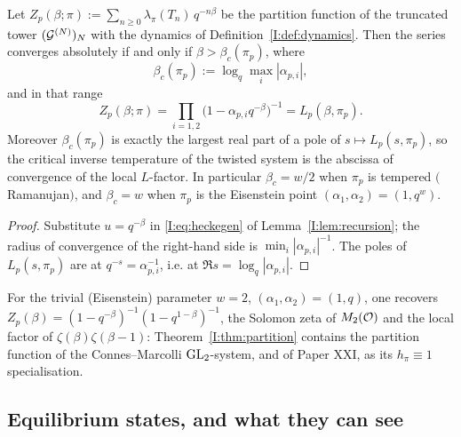 \begin{theorem}\label{I:thm:partition}
Let $Z_p(\beta;\pi):=\sum_{n\ge0}\lambda_\pi(T_n)\,q^{-n\beta}$ be the partition function
of the truncated tower $(\mathcal{G}^{(N)})_N$ with the dynamics of
Definition~\ref{I:def:dynamics}. Then the series converges absolutely if and only if
$\beta>\beta_c(\pi_p)$, where
\[
\beta_c(\pi_p):=\log_q\max_i|\alpha_{p,i}|,
\]
and in that range
\[
\boxed{\;Z_p(\beta;\pi)=\prod_{i=1,2}\bigl(1-\alpha_{p,i}q^{-\beta}\bigr)^{-1}
=L_p(\beta,\pi_p).\;}
\]
Moreover $\beta_c(\pi_p)$ is exactly the largest real part of a pole of
$s\mapsto L_p(s,\pi_p)$, so the critical inverse temperature of the twisted system is the
abscissa of convergence of the local $L$-factor. In particular
$\beta_c=w/2$ when $\pi_p$ is tempered $($Ramanujan$)$, and $\beta_c=w$ when $\pi_p$ is the
Eisenstein point $(\alpha_1,\alpha_2)=(1,q^{w})$.
\end{theorem}

\begin{proof}
Substitute $u=q^{-\beta}$ in \eqref{I:eq:heckegen} of Lemma~\ref{I:lem:recursion}; the radius
of convergence of the right-hand side is $\min_i|\alpha_{p,i}|^{-1}$. The poles of
$L_p(s,\pi_p)$ are at $q^{-s}=\alpha_{p,i}^{-1}$, i.e. at
$\Re s=\log_q|\alpha_{p,i}|$.
\end{proof}

\begin{remark}
For the trivial (Eisenstein) parameter $w=2$, $(\alpha_1,\alpha_2)=(1,q)$, one recovers
$Z_p(\beta)=(1-q^{-\beta})^{-1}(1-q^{1-\beta})^{-1}$, the Solomon zeta of $M_2(\mathcal{O})$ and
the local factor of $\zeta(\beta)\zeta(\beta-1)$: Theorem~\ref{I:thm:partition} contains
the partition function of the Connes--Marcolli $\mathrm{GL}_2$-system, and of Paper XXI, as its
$h_\pi\equiv1$ specialisation.
\end{remark}

\subsection{Equilibrium states, and what they can see}

